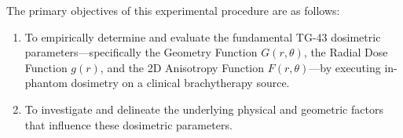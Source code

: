 The primary objectives of this experimental procedure are as follows:
\begin{enumerate}
    \item To empirically determine and evaluate the fundamental TG-43 dosimetric parameters—specifically the Geometry Function $G(r,\theta)$, the Radial Dose Function $g(r)$, and the 2D Anisotropy Function $F(r,\theta)$—by executing in-phantom dosimetry on a clinical brachytherapy source.
    \item To investigate and delineate the underlying physical and geometric factors that influence these dosimetric parameters.
\end{enumerate}